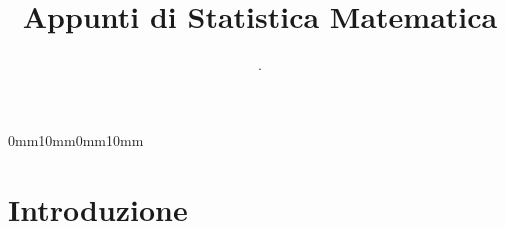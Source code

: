 \documentclass[11pt,a4paper]{article}
\title{Appunti di Statistica Matematica}
\author{.}
\date{}
\begin{document}
\setmarginsrb{30mm}{10mm}{25mm}{30mm}%
             {0mm}{10mm}{0mm}{10mm}
             
\maketitle
\section{Introduzione}








\end{document}
